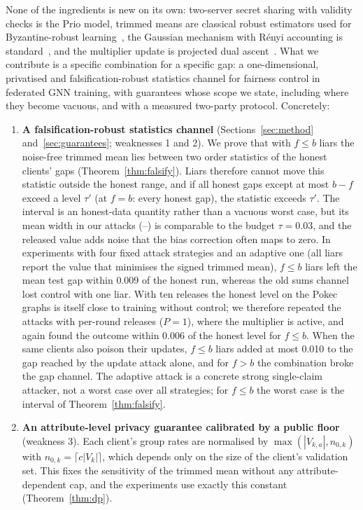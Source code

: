 None of the ingredients is new on its own: two-server secret sharing with validity checks is the Prio model, trimmed means are classical robust estimators used for Byzantine-robust learning~\citep{yin2018byzantine}, the Gaussian mechanism with R\'enyi accounting is standard~\citep{mironov2017renyi}, and the multiplier update is projected dual ascent~\citep{cotter2019optimization}. What we contribute is a specific combination for a specific gap: a one-dimensional, privatised and falsification-robust statistics channel for fairness control in federated GNN training, with guarantees whose scope we state, including where they become vacuous, and with a measured two-party protocol. Concretely:
\begin{enumerate}
\item \textbf{A falsification-robust statistics channel} (Sections~\ref{sec:method} and~\ref{sec:guarantees}; weaknesses 1 and 2). We prove that with $f\le b$ liars the noise-free trimmed mean lies between two order statistics of the honest clients' gaps (Theorem~\ref{thm:falsify}). Liars therefore cannot move this statistic outside the honest range, and if all honest gaps except at most $b-f$ exceed a level $\tau'$ (at $f=b$: every honest gap), the statistic exceeds $\tau'$. The interval is an honest-data quantity rather than a vacuous worst case, but its mean width in our attacks (\spreadMin--\spreadMax) is comparable to the budget $\tau=0.03$, and the released value adds noise that the bias correction often maps to zero. In experiments with four fixed attack strategies and an adaptive one (all liars report the value that minimises the signed trimmed mean), $f\le b$ liars left the mean test gap within 0.009 of the honest run, whereas the old sums channel lost control with one liar. With ten releases the honest level on the Pokec graphs is itself close to training without control; we therefore repeated the attacks with per-round releases ($P=1$), where the multiplier is active, and again found the outcome within 0.006 of the honest level for $f\le b$. When the same clients also poison their updates, $f\le b$ liars added at most 0.010 to the gap reached by the update attack alone, and for $f>b$ the combination broke the gap channel. The adaptive attack is a concrete strong single-claim attacker, not a worst case over all strategies; for $f\le b$ the worst case is the interval of Theorem~\ref{thm:falsify}.
\item \textbf{An attribute-level privacy guarantee calibrated by a public floor} (weakness 3). Each client's group rates are normalised by $\max(|V_{k,a}|,n_{0,k})$ with $n_{0,k}=\lceil c|V_k|\rceil$, which depends only on the size of the client's validation set. This fixes the sensitivity of the trimmed mean without any attribute-dependent cap, and the experiments use exactly this constant (Theorem~\ref{thm:dp}).

\end{enumerate}
